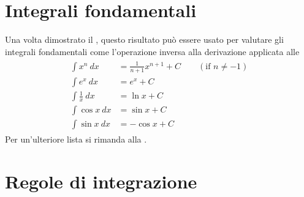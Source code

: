 \documentclass[letterpaper,10pt,italian]{jupyterBook}
\begin{document}
\section{Integrali fondamentali}
\label{\detokenize{ch/infinitesimal_calculus/integrals:integrali-fondamentali}}\label{\detokenize{ch/infinitesimal_calculus/integrals:infinitesimal-calculus-integrals-fund}}
\sphinxAtStartPar
Una volta dimostrato il {\hyperref[\detokenize{ch/infinitesimal_calculus/integrals:infinitesimal-calculus-integrals-thm-fund}]{}}, questo risultato può essere usato per valutare gli integrali fondamentali come l’operazione inversa alla derivazione applicata alle {\hyperref[\detokenize{ch/infinitesimal_calculus/derivatives:infinitesimal-calculus-derivatives-fund}]{}}
\begin{equation*}
\begin{split}\begin{aligned}
 \int x^n         \ dx & = \frac{1}{n+1} x^{n+1} + C  \qquad (\text{if } n \neq -1) \\ 
 \int e^x         \ dx & = e^x                   + C \\ 
 \int \frac{1}{x} \ dx & = \ln x                 + C \\ 
 \int \cos x      \ dx & = \sin x                + C \\ 
 \int \sin x      \ dx & =-\cos x                + C    
\end{aligned}\end{split}
\end{equation*}
\sphinxAtStartPar
Per un’ulteriore lista si rimanda alla {\hyperref[\detokenize{ch/infinitesimal_calculus/integrals-table:infinitesimal-calculus-integrals-table}]{}}.


\section{Regole di integrazione}
\label{\detokenize{ch/infinitesimal_calculus/integrals:regole-di-integrazione}}\label{\detokenize{ch/infinitesimal_calculus/integrals:infinitesimal-calculus-integrals-rules}}
\end{document}
